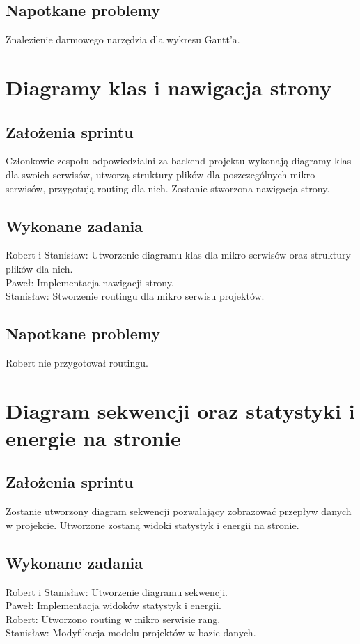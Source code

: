 \documentclass[a4paper,11pt]{report}
\begin{document}
\subsection {Napotkane problemy}
Znalezienie darmowego narzędzia dla wykresu Gantt'a.

\section {Diagramy klas i nawigacja strony}
\subsection {Założenia sprintu}
Członkowie zespołu odpowiedzialni za backend projektu wykonają diagramy klas dla swoich serwisów, utworzą struktury plików dla poszczególnych mikro serwisów, przygotują routing dla nich. Zostanie stworzona nawigacja strony.
\subsection {Wykonane zadania}
Robert i Stanisław: Utworzenie diagramu klas dla mikro serwisów oraz struktury plików dla nich.\\
Paweł: Implementacja nawigacji strony. \\
Stanisław: Stworzenie routingu dla mikro serwisu projektów.\\
\subsection {Napotkane problemy}
Robert nie przygotował routingu.

\section {Diagram sekwencji oraz statystyki i energie na stronie}
\subsection {Założenia sprintu}
Zostanie utworzony diagram sekwencji pozwalający zobrazować przepływ danych w projekcie. Utworzone zostaną widoki statystyk i energii na stronie.
\subsection {Wykonane zadania}
Robert i Stanisław: Utworzenie diagramu sekwencji.\\
Paweł: Implementacja widoków statystyk i energii. \\
Robert: Utworzono routing w mikro serwisie rang.\\
Stanisław: Modyfikacja modelu projektów w bazie danych.\\
\end{document}
